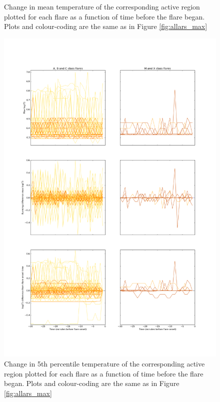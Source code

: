 \documentclass[referee,a4paper,12pt,traditabstract]{swsc}
\begin{document}
\begin{linenumbers}
\begin{figure}
	\caption{Change in mean temperature of the corresponding active region plotted for each flare as a function of time before the flare began. Plots and colour-coding are the same as in Figure \ref{fig:allars_max}}
	\label{fig:allars_mean}
\end{figure}
\begin{figure}
	\centering
		\includegraphics[width=0.7\columnwidth]{tempplotsmax/allars.png}
	\caption{Change in 5th percentile temperature of the corresponding active region plotted for each flare as a function of time before the flare began. Plots and colour-coding are the same as in Figure \ref{fig:allars_max}}
	\label{fig:allars_p5}
\end{figure}
\begin{figure}
	\centering

\end{figure}
\end{linenumbers}
\end{document}
